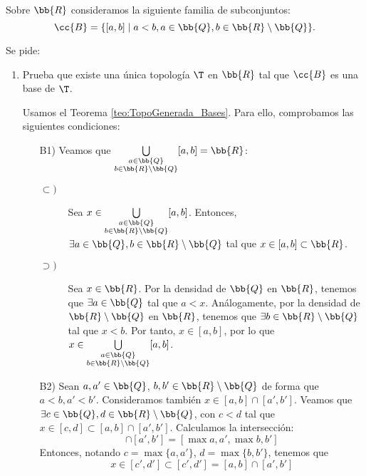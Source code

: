 \begin{ejercicio}
    Sobre $\bb{R}$ consideramos la siguiente familia de subconjuntos:
    \begin{equation*}
        \cc{B}=\{[a,b]\mid a<b,a\in \bb{Q}, b\in \bb{R}\setminus \bb{Q}\}.
    \end{equation*}

    Se pide:
    \begin{enumerate}[label=\alph*)]
        \item Prueba que existe una única topología $\T$ en $\bb{R}$ tal que $\cc{B}$ es una base de $\T$.

        Usamos el Teorema \ref{teo:TopoGenerada_Bases}. Para ello, comprobamos las siguientes condiciones:
        \begin{enumerate}
            \item[B1)] Veamos que $\bigcup\limits_{\substack{a\in \bb{Q}\\b\in \bb{R}\setminus\bb{Q}}} [a,b]=\bb{R}$:
            \begin{description}
                \item[$\subset)$]
                    Sea $x\in \bigcup\limits_{\substack{a\in \bb{Q}\\b\in \bb{R}\setminus\bb{Q}}} [a,b]$. Entonces, $\exists a\in \bb{Q}, b\in \bb{R}\setminus\bb{Q}$ tal que $x\in [a,b]\subset \bb{R}$.

                \item[$\supset)$]
                    Sea $x\in \bb{R}$. Por la densidad de $\bb{Q}$ en $\bb{R}$, tenemos que $\exists a\in \bb{Q}$ tal que $a<x$. Análogamente, por la densidad de $\bb{R}\setminus\bb{Q}$ en $\bb{R}$, tenemos que $\exists b\in \bb{R}\setminus\bb{Q}$ tal que $x<b$. Por tanto, $x\in [a,b]$, por lo que $x\in \bigcup\limits_{\substack{a\in \bb{Q}\\b\in \bb{R}\setminus\bb{Q}}} [a,b]$.
            \end{description}

            
            \item[B2)] Sean $a,a'\in \bb{Q}$, $b,b'\in \bb{R}\setminus\bb{Q}$ de forma que $a<b, a'<b'$. Consideramos también $x\in [a,b]\cap [a',b']$. Veamos que $\exists c\in \bb{Q}, d\in \bb{R}\setminus\bb{Q}$, con $c<d$ tal que $x\in [c,d]\subset [a,b]\cap [a',b']$. Calculamos la intersección:
            \begin{equation*}
                [a,b]\cap [a',b']=[\max{a,a'},\max{b,b'}]
            \end{equation*}
            Entonces, notando $c=\max\{a,a'\}$, $d=\max\{b,b'\}$, tenemos que
            \begin{equation*}
                x\in [c',d']\subset [c',d']=[a,b]\cap [a',b']
            \end{equation*}


\end{enumerate}
\end{enumerate}
\end{ejercicio}
